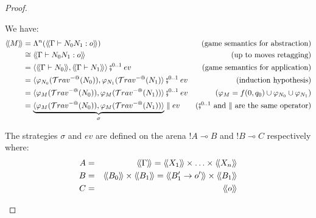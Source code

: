 \begin{proof}
\begin{itemize}
    We have:
    \begin{align*}
    \intersem{M}
        &=  \Lambda^n( \intersem{\Gamma \vdash N_0 N_1 : o} )
            & \mbox{(game semantics for abstraction)}\\
        &\cong  \intersem{\Gamma \vdash N_0 N_1 : o}
            & \mbox{(up to moves retagging)}\\
        &=  \langle \intersem{\Gamma \vdash N_0}, \intersem{\Gamma \vdash N_1} \rangle \fatsemi^{0..1} ev
            & \mbox{(game semantics for application)}\\
        &=  \langle \varphi_{N_0} (\travset^{-@}(N_0)), \varphi_{N_1}(\travset^{-@}(N_1) \rangle \fatsemi^{0..1} ev
            & \mbox{(induction hypothesis)}\\
        &=  \langle \varphi_{M} (\travset^{-@}(N_0)), \varphi_{M}(\travset^{-@}(N_1)) \rangle \fatsemi^{0..1} ev
            & \mbox{($\varphi_M = f(0,q_0) \union \varphi_{N_0} \union \varphi_{N_1}$)} \\
        &=  \underbrace{\langle \varphi_{M} (\travset^{-@}(N_0)), \varphi_{M}(\travset^{-@}(N_1)) \rangle}_{\sigma} \parallel ev
            & \mbox{($\fatsemi^{0..1}$ and $\parallel$ are the same operator)}
    \end{align*}


    The strategies $\sigma$ and $ev$ are defined on the arena $!A \multimap B$ and $!B \multimap C$ respectively where:
    \begin{eqnarray*}
        A &=& \intersem{\Gamma} = \intersem{X_1} \times \ldots \times \intersem{X_n}\\
        B &=& \intersem{B_0} \times \intersem{B_1} = \intersem{B_1' \rightarrow o'} \times \intersem{B_1} \\
        C &=& \intersem{o}
    \end{eqnarray*}


\end{itemize}
\end{proof}

